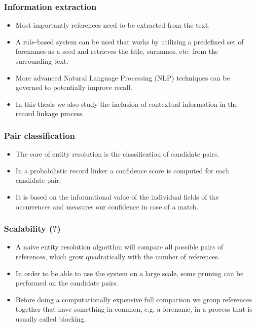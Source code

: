\documentclass[paper=a4, fontsize=11pt]{scrartcl}
\begin{document}
\subsubsection{Information extraction}
\begin{itemize}
	\item Most importantly references need to be extracted from the text.
	\item A rule-based system can be used that works by utilizing a predefined set of forenames as a seed and retrieves the title, surnames, etc. from the surrounding text.
	\item More advanced Natural Language Processing (NLP) techniques can be governed to potentially improve recall.
	\item In this thesis we also study the inclusion of contextual information in the record linkage process.
\end{itemize}

\subsubsection{Pair classification}
\begin{itemize}
	\item The core of entity resolution is the classification of candidate pairs.
	\item In a probabilistic record linker a confidence score is computed for each candidate pair.
	\item It is based on the informational value of the individual fields of the occurrences and measures our confidence in case of a match.
\end{itemize}

\subsubsection{Scalability (?)}
\begin{itemize}
	\item A naive entity resolution algorithm will compare all possible pairs of references, which grow quadratically with the number of references.
	\item In order to be able to use the system on a large scale, some pruning can be performed on the candidate pairs.
	\item Before doing a computationally expensive full comparison we group references together that have something in common, e.g. a forename, in a process that is usually called blocking.
\end{itemize}
\end{document}

